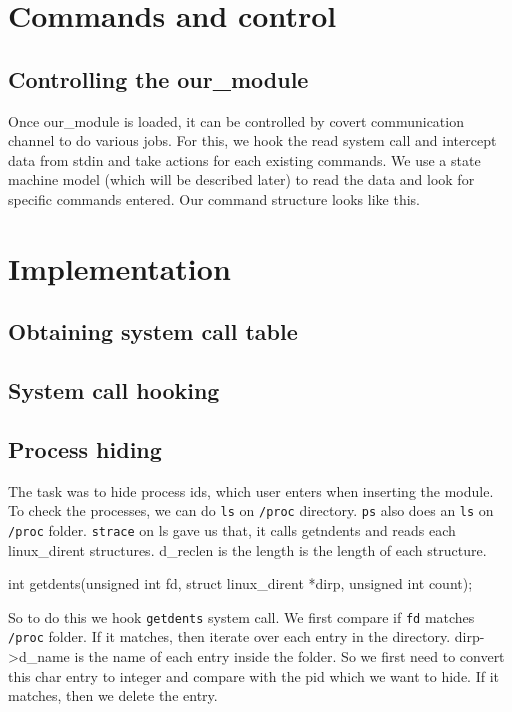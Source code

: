 \documentclass[10pt, letterpaper]{scrartcl}
\begin{document}
\section{Commands and control}
    \subsection{Controlling the our\_module}
    Once our\_module is loaded, it can be controlled by covert communication channel to do various jobs. 
For this, we hook the read system call and intercept data from stdin and take actions for each existing  commands. 
We use a state machine model (which will be described later) to read the data and look for specific commands entered. 
Our command structure looks like this.

\section{Implementation}

\subsection{Obtaining system call table}

\subsection{System call hooking}

\subsection{Process hiding}
The task was to hide process ids, which user enters when inserting the module. 
To check the processes, we can do \texttt{ls} on \texttt{/proc} directory. 
\texttt{ps} also does an \texttt{ls} on \texttt{/proc} folder.   
\texttt{strace} on ls gave us that, it calls getndents and reads each linux\_dirent structures. 
d\_reclen is the length is the length of each structure. 


int getdents(unsigned int fd, struct linux\_dirent *dirp,
                    unsigned int count);


So to do this we hook \texttt{getdents} system call. 
We first compare if \texttt{fd} matches \texttt{/proc} folder. 
If it matches, then iterate over each entry in the directory.
dirp->d\_name is the name of each entry inside the folder. 
So we first need to convert this char entry to integer and compare with the pid which we want to hide.
If it matches, then we delete the entry. 
\end{document}
